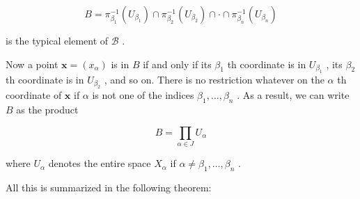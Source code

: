 \[
B = {\pi }_{{\beta }_{1}}^{-1}\left( {U}_{{\beta }_{1}}\right)  \cap  {\pi }_{{\beta }_{2}}^{-1}\left( {U}_{{\beta }_{2}}\right)  \cap   \cdot   \cap  {\pi }_{{\beta }_{n}}^{-1}\left( {U}_{{\beta }_{n}}\right)
\]

is the typical element of \(\mathcal{B}\) .

Now a point \(\mathbf{x} = \left( {x}_{\alpha }\right)\) is in \(B\) if and only if its \({\beta }_{1}\) th coordinate is in \({U}_{{\beta }_{1}}\) , its \({\beta }_{2}\) th coordinate is in \({U}_{{\beta }_{2}}\) , and so on. There is no restriction whatever on the \(\alpha\) th coordinate of \(\mathbf{x}\) if \(\alpha\) is not one of the indices \({\beta }_{1},\ldots ,{\beta }_{n}\) . As a result, we can write \(B\) as the product

\[
B = \mathop{\prod }\limits_{{\alpha  \in  J}}{U}_{\alpha }
\]

where \({U}_{\alpha }\) denotes the entire space \({X}_{\alpha }\) if \(\alpha  \neq  {\beta }_{1},\ldots ,{\beta }_{n}\) .

All this is summarized in the following theorem:

